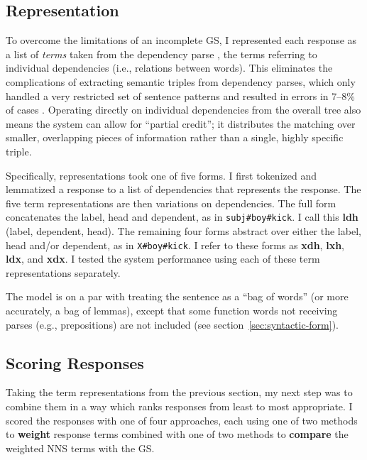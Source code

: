 \subsection{Representation}
\label{sec:representation}

To overcome the limitations of an incomplete GS, I represented each
response as a list of \textit{terms} taken from the dependency parse
\citep{demarneffe:ea:06}, the terms referring to
individual dependencies (i.e., relations between words).
This eliminates the complications of extracting semantic triples from
dependency parses, which only handled a very restricted set of
sentence patterns and resulted in errors in 7--8\% of cases
\citep{king:dickinson:13}. Operating directly on individual
dependencies from the overall tree also means the system can allow for
``partial credit''; it distributes the matching over smaller,
overlapping pieces of information rather than a single, highly
specific triple.

Specifically, representations took one of five forms.  I first
tokenized and lemmatized a response to a list of dependencies that
represents the response.
The five term representations are then variations on dependencies. The
full form concatenates the label, head and dependent, as in
\texttt{subj\#boy\#kick}. I call this \textbf{ldh} (label, dependent,
head). The remaining four forms abstract over either the label, head
and/or dependent, as in \texttt{X\#boy\#kick}. I refer to these forms
as \textbf{xdh}, \textbf{lxh}, \textbf{ldx}, and \textbf{xdx}. I tested the system performance using each of these term representations separately.

The  model is on a par with treating the sentence as a ``bag
of words'' (or more accurately, a bag of lemmas), except that some function words not receiving parses (e.g., prepositions) are not included (see section~\ref{sec:syntactic-form}).

\subsection{Scoring Responses}
\label{sec:scoring}

Taking the term representations from the previous section, my next
step was to combine them in a way which ranks responses from least to
most appropriate.  I scored the responses with one of four approaches, each
using one of two methods to \textbf{weight} response terms combined
with one of two methods to \textbf{compare} the weighted NNS terms
with the GS.

